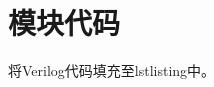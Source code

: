 \appendix
\section{模块代码}

将Verilog代码填充至lstlisting中。

\begin{lstlisting}[language=Verilog]

\end{lstlisting}
